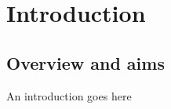 \chapter{Introduction}
\label{cha:intro}

\section{Overview and aims}

An introduction goes here




